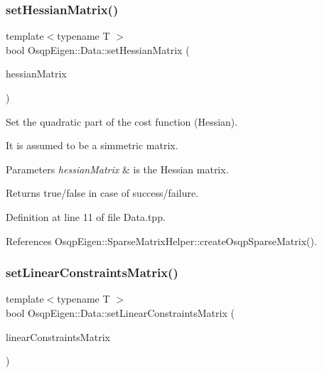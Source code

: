 \mbox{\label{classOsqpEigen_1_1Data_a58dfe4bfbb1b843736496eea9d0acfb7}} 
\subsubsection{\texorpdfstring{set\+Hessian\+Matrix()}{setHessianMatrix()}}
{\footnotesize\ttfamily template$<$typename T $>$ \\
bool Osqp\+Eigen\+::\+Data\+::set\+Hessian\+Matrix (\begin{DoxyParamCaption}\item[{const Eigen\+::\+Sparse\+Matrix$<$ T $>$ \&}]{hessian\+Matrix }\end{DoxyParamCaption})}



Set the quadratic part of the cost function (Hessian). 

It is assumed to be a simmetric matrix. 
\begin{DoxyParams}{Parameters}
{\em hessian\+Matrix} & is the Hessian matrix. \\
\hline
\end{DoxyParams}
\begin{DoxyReturn}{Returns}
true/false in case of success/failure. 
\end{DoxyReturn}


Definition at line 11 of file Data.\+tpp.



References Osqp\+Eigen\+::\+Sparse\+Matrix\+Helper\+::create\+Osqp\+Sparse\+Matrix().

\mbox{\label{classOsqpEigen_1_1Data_a202b1b554cad83590bf9999b1ffdf6c5}} 
\subsubsection{\texorpdfstring{set\+Linear\+Constraints\+Matrix()}{setLinearConstraintsMatrix()}}
{\footnotesize\ttfamily template$<$typename T $>$ \\
bool Osqp\+Eigen\+::\+Data\+::set\+Linear\+Constraints\+Matrix (\begin{DoxyParamCaption}\item[{const Eigen\+::\+Sparse\+Matrix$<$ T $>$ \&}]{linear\+Constraints\+Matrix }\end{DoxyParamCaption})}



